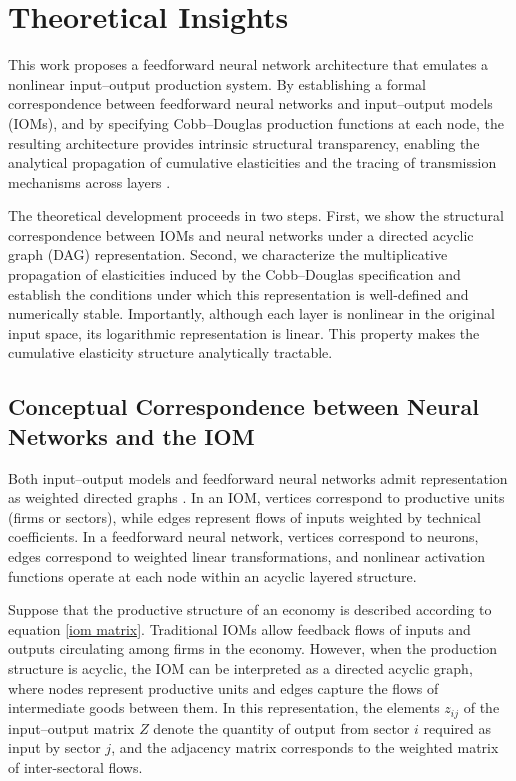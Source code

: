 \documentclass[preprint,12pt,authoryear]{sn-jnl}
\begin{document}
\section{Theoretical Insights} \label{sec:theory}

This work proposes a feedforward neural network architecture that emulates a nonlinear input--output production system. By establishing a formal correspondence between feedforward neural networks and input--output models (IOMs), and by specifying Cobb--Douglas production functions at each node, the resulting architecture provides intrinsic structural transparency, enabling the analytical propagation of cumulative elasticities and the tracing of transmission mechanisms across layers \citep{acemoglu2012network}.

The theoretical development proceeds in two steps. First, we show the structural correspondence between IOMs and neural networks under a directed acyclic graph (DAG) representation. Second, we characterize the multiplicative propagation of elasticities induced by the Cobb--Douglas specification and establish the conditions under which this representation is well-defined and numerically stable. Importantly, although each layer is nonlinear in the original input space, its logarithmic representation is linear. This property makes the cumulative elasticity structure analytically tractable.


\subsection{Conceptual Correspondence between Neural Networks and the IOM}

Both input–output models and feedforward neural networks admit representation as weighted directed graphs \citep{sargent2024economic}. In an IOM, vertices correspond to productive units (firms or sectors), while edges represent flows of inputs weighted by technical coefficients. In a feedforward neural network, vertices correspond to neurons, edges correspond to weighted linear transformations, and nonlinear activation functions operate at each node within an acyclic layered structure.

Suppose that the productive structure of an economy is described according to equation \ref{iom matrix}. Traditional IOMs allow feedback flows of inputs and outputs circulating among firms in the economy. However, when the production structure is acyclic, the IOM can be interpreted as a directed acyclic graph, where nodes represent productive units and edges capture the flows of intermediate goods between them. In this representation, the elements $z_{ij}$ of the input–output matrix $Z$ denote the quantity of output from sector $i$ required as input by sector $j$, and the adjacency matrix corresponds to the weighted matrix of inter-sectoral flows.
\end{document}
